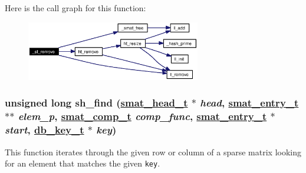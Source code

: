Here is the call graph for this function:\begin{figure}[H]
\begin{center}
\leavevmode
\includegraphics[width=215pt]{group__dbprim__smat_ga24_cgraph}
\end{center}
\end{figure}
\hypertarget{group__dbprim__smat_ga22}{
\subsubsection[sh\_\-find]{\setlength{\rightskip}{0pt plus 5cm}unsigned long sh\_\-find (\hyperlink{struct__smat__head__s}{smat\_\-head\_\-t} $\ast$ {\em head}, \hyperlink{struct__smat__entry__s}{smat\_\-entry\_\-t} $\ast$$\ast$ {\em elem\_\-p}, \hyperlink{group__dbprim__smat_ga5}{smat\_\-comp\_\-t} {\em comp\_\-func}, \hyperlink{struct__smat__entry__s}{smat\_\-entry\_\-t} $\ast$ {\em start}, \hyperlink{struct__db__key__s}{db\_\-key\_\-t} $\ast$ {\em key})}}
\label{group__dbprim__smat_ga22}


This function iterates through the given row or column of a sparse matrix looking for an element that matches the given {\tt key}.

